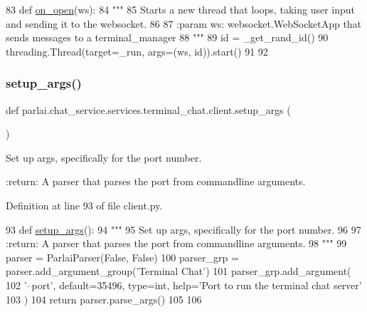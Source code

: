 \begin{DoxyCode}
83 \textcolor{keyword}{def }\hyperlink{namespaceparlai_1_1chat__service_1_1services_1_1terminal__chat_1_1client_a9186bee0436623cc10a378752ba8a61c}{on\_open}(ws):
84     \textcolor{stringliteral}{"""}
85 \textcolor{stringliteral}{    Starts a new thread that loops, taking user input and sending it to the websocket.}
86 \textcolor{stringliteral}{}
87 \textcolor{stringliteral}{    :param ws: websocket.WebSocketApp that sends messages to a terminal\_manager}
88 \textcolor{stringliteral}{    """}
89     id = \_get\_rand\_id()
90     threading.Thread(target=\_run, args=(ws, id)).start()
91 
92 
\end{DoxyCode}
\mbox{\label{namespaceparlai_1_1chat__service_1_1services_1_1terminal__chat_1_1client_abcdfe1196113d8ab4476dcde362c83d8}} 
\subsubsection{\texorpdfstring{setup\+\_\+args()}{setup\_args()}}
{\footnotesize\ttfamily def parlai.\+chat\+\_\+service.\+services.\+terminal\+\_\+chat.\+client.\+setup\+\_\+args (\begin{DoxyParamCaption}{ }\end{DoxyParamCaption})}

\begin{DoxyVerb}Set up args, specifically for the port number.

:return: A parser that parses the port from commandline arguments.
\end{DoxyVerb}
 

Definition at line 93 of file client.\+py.


\begin{DoxyCode}
93 \textcolor{keyword}{def }\hyperlink{namespaceparlai_1_1chat__service_1_1services_1_1terminal__chat_1_1client_abcdfe1196113d8ab4476dcde362c83d8}{setup\_args}():
94     \textcolor{stringliteral}{"""}
95 \textcolor{stringliteral}{    Set up args, specifically for the port number.}
96 \textcolor{stringliteral}{}
97 \textcolor{stringliteral}{    :return: A parser that parses the port from commandline arguments.}
98 \textcolor{stringliteral}{    """}
99     parser = ParlaiParser(\textcolor{keyword}{False}, \textcolor{keyword}{False})
100     parser\_grp = parser.add\_argument\_group(\textcolor{stringliteral}{'Terminal Chat'})
101     parser\_grp.add\_argument(
102         \textcolor{stringliteral}{'--port'}, default=35496, type=int, help=\textcolor{stringliteral}{'Port to run the terminal chat server'}
103     )
104     \textcolor{keywordflow}{return} parser.parse\_args()
105 
106 
\end{DoxyCode}


